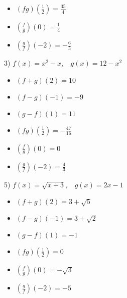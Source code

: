 \documentclass[11pt]{book}
\theoremstyle{definition}  %
\begin{document}
\begin{multicols}{3}
\begin{itemize}
\item  $(fg)(\frac{1}{2})=\frac{35}{4}$
\item  $\left(\frac{f}{g}\right)(0)=\frac{1}{4}$
\item  $\left(\frac{g}{f}\right)(-2)=-\frac{6}{5}$
\end{itemize}
\end{multicols}
\normalsize

3) $f(x)=x^2-x,~~~~g(x)=12-x^2$ 
\scriptsize
\begin{multicols}{3}
\begin{itemize}
\item  $(f+g)(2)=10$
\item  $(f-g)(-1)=-9$
\item  $(g-f)(1)=11$
\end{itemize}
\end{multicols}

\begin{multicols}{3}
\begin{itemize}
\item  $(fg)(\frac{1}{2})=-\frac{47}{16}$
\item  $\left(\frac{f}{g}\right)(0)=0$
\item  $\left(\frac{g}{f}\right)(-2)=\frac{4}{3}$
\end{itemize}
\end{multicols}
\normalsize

5) $f(x)=\sqrt{x+3},~~~~g(x)=2x-1$ 
\scriptsize
\begin{multicols}{3}
\begin{itemize}
\item  $(f+g)(2)=3+\sqrt{5}$
\item  $(f-g)(-1)=3+\sqrt{2}$
\item  $(g-f)(1)=-1$
\end{itemize}
\end{multicols}

\begin{multicols}{3}
\begin{itemize}
\item  $(fg)(\frac{1}{2})=0$
\item  $\left(\frac{f}{g}\right)(0)=-\sqrt{3}$
\item  $\left(\frac{g}{f}\right)(-2)=-5$
\end{itemize}
\end{multicols}
\normalsize
\end{document}
